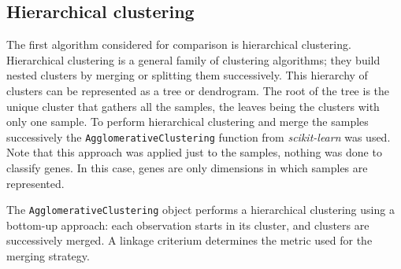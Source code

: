 \subsection{Hierarchical clustering}\label{sec:hc}
The first algorithm considered for comparison is hierarchical clustering. Hierarchical clustering is a general family of clustering algorithms; they build nested clusters by merging or splitting them successively. This hierarchy of clusters can be represented as a tree or dendrogram. The root of the tree is the unique cluster that gathers all the samples, the leaves being the clusters with only one sample. To perform hierarchical clustering and merge the samples successively the \texttt{AgglomerativeClustering} function from \textit{scikit-learn} was used. Note that this approach was applied just to the samples, nothing was done to classify genes. In this case, genes are only dimensions in which samples are represented.

The \texttt{AgglomerativeClustering} object performs a hierarchical clustering using a bottom-up approach: each observation starts in its cluster, and clusters are successively merged. A linkage criterium determines the metric used for the merging strategy. 

